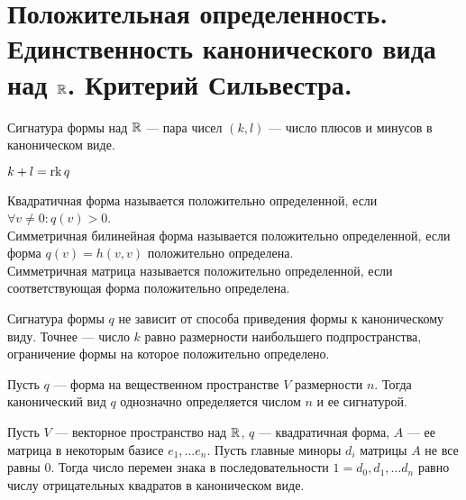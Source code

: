 \section{Положительная определенность. Единственность канонического вида над $ \mathbb{R}$. Критерий Сильвестра.}
\begin{defn}
    {\sf Сигнатура формы} над $ \mathbb{R}$ --- пара чисел  $ (k, l)$ --- число плюсов и минусов в каноническом виде.
     \begin{note}
        $ k + l  = \operatorname{rk} q$
    \end{note}
\end{defn}

\begin{defn}
    Квадратичная форма называется {\sf положительно определенной}, если   $ \forall v \ne 0\colon q(v) > 0$.\\
    Симметричная билинейная форма называется {\sf положительно определенной}, если форма $ q(v) = h(v, v)$ положительно определена.\\
    Симметричная матрица называется {\sf положительно определенной}, если соответствующая форма положительно определена.  
\end{defn}
\begin{thm}
    Сигнатура формы $ q$ не зависит  от способа приведения формы к каноническому виду. Точнее --- число  $ k$ равно размерности наибольшего подпространства, ограничение формы на которое положительно определено.
\end{thm}
\begin{cor}
    Пусть $ q$ --- форма на вещественном пространстве $ V$ размерности  $ n$. Тогда канонический вид  $ q$ однозначно определяется числом  $ n$ и ее сигнатурой.
\end{cor}
\begin{thm}
    Пусть $ V$ --- векторное пространство над $ \mathbb{R}$,  $ q$ --- квадратичная форма,  $ A$ --- ее матрица в некоторым базисе $ e_1, \ldots e_n$. Пусть главные миноры $ d_i$ матрицы  $ A$ не все равны 0. Тогда число перемен знака в последовательности $ 1 = d_0, d_1, \ldots d_n$ равно числу отрицательных квадратов в каноническом виде.
\end{thm}
